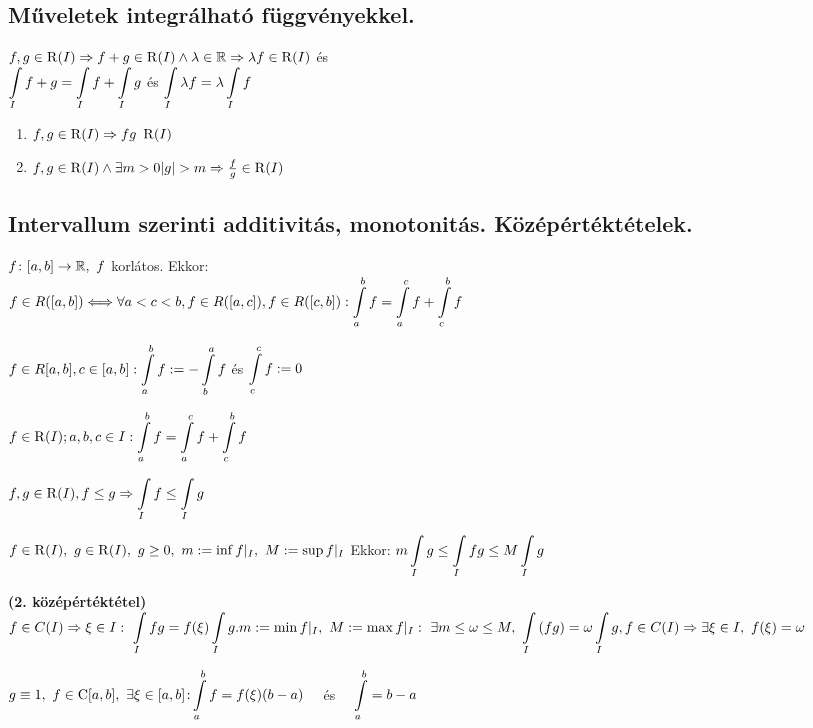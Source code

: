 \subsection{Műveletek integrálható függvényekkel.}
\begin{te}
  $f,g\in{\operatorname{R}(I)}\Rightarrow{f+g}\in{\operatorname{R}(I)}\land\lambda\in\mathbb{R}\Rightarrow\lambda{f}\in{\operatorname{R}(I)}$ és\\
  $\di\Int_I{f+g}=\Int_I{f}+\Int_I{g}$ és $\di\Int_I\la{f}=\la\Int_I{f}$
\end{te}

\begin{te}
  \begin{enumerate}
  \item $f,g\in \Rint(I)\nn fg\ \Rint(I)$
  \item $f,g\in \Rint(I) \land\exists m>0|g|>m\nn\frac{f}{g}\in \Rint(I)$
  \end{enumerate}
\end{te}

\subsection{Intervallum szerinti additivitás, monotonitás. Középértéktételek.}
\begin{te}
  $f\colon[a,b]\to\mathbb{R},\ f$ korlátos. Ekkor:\\
  $f\in{R([a,b])}\ek\forall{a<c<b}, f\in R([a,c]),f\in R([c,b]): \di\Int_a^bf=\Int_a^cf+\Int_c^bf$
\end{te}

\begin{de}
  $f\in R[a,b], c\in[a,b]: \di\Int_a^bf:=-\Int_b^af$ és $\di\Int_c^cf:=0$
\end{de}

\begin{te}
  $f\in \Rint(I); a,b,c\in I:\di\Int_a^bf=\Int_a^cf+\Int_c^bf\\$
\end{te}
\begin{te}
  $f,g\in \Rint(I),f\le g\nn\di\Int_If\le\Int_Ig$
\end{te}

\begin{te}
  $f\in \operatorname{R}(I),~g\in \operatorname{R}(I),~g\ge0,~m:=\inf{f\vert_I},~M:=\sup{f\vert_I}\\$
  Ekkor: $m\di\Int_I g\le\Int_I{fg}\le M\Int_Ig$
\end{te}

\begin{Megj}
\item \textbf{(2. középértéktétel)}
  $\di f\in C(I)\nn\xi\in I:~\Int_Ifg=f(\xi)\Int_Ig.\\ m:=\min{f|_I},~ M:=\max{f|_I}:~
  \exists m\le\omega\le M,~ \Int_I{(fg)}=\omega\Int_I{g},\\ f\in C(I)\nn\exists\xi\in I,\ f(\xi)=\omega\\$
\item $\di g\equiv 1,~f\in \Folyt[a,b],~ \exists\xi\in[a,b]\colon\\\Int_a^bf=f(\xi)(b-a)\quad$ és $\quad\di\Int_a^b=b-a$
\end{Megj}

